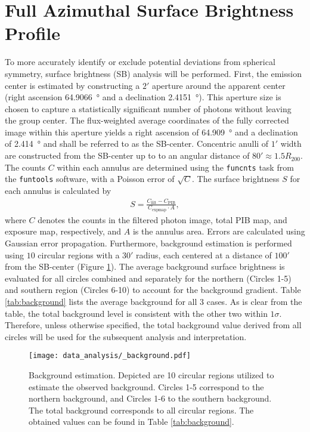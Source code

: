 \section{Full Azimuthal Surface Brightness Profile}\label{sec:full_az}
To more accurately identify or exclude potential deviations from spherical symmetry, surface brightness (SB) analysis will be performed. First, the emission center is estimated by constructing a \(2'\) aperture around the apparent center (right ascension \SI{64.9066}{\degree} and a declination \SI{2.4151}{\degree}). This aperture size is chosen to capture a statistically significant number of photons without leaving the group center. The flux-weighted average coordinates of the fully corrected image within this aperture yields a right ascension of \SI{64.909}{\degree} and a declination of \SI{2.414}{\degree} and shall be referred to as the SB-center. Concentric anulli of \(1'\) width are constructed from the SB-center up to to an angular distance of \(80' \approx 1.5R_{200}\). The counts \(C\) within each annulus are determined using the \texttt{funcnts} task from the \texttt{funtools} software, with a Poisson error of \(\sqrt{C}\). The surface brightness \(S\) for each annulus is calculated by
\begin{align*}
    S = \frac{C_\text{filt} - C_\text{PIB}}{C_\text{expmap}\cdot A},
\end{align*}
where \(C\) denotes the counts in the filtered photon image, total PIB map, and exposure map, respectively, and \(A\) is the annulus area. Errors are calculated using Gaussian error propagation. Furthermore, background estimation is performed using \(10\) circular regions with a \(30'\) radius, each centered at a distance of \(100'\) from the SB-center (Figure \ref{fig:background_circles}). The average background surface brightness is evaluated for all circles combined and separately for the northern (Circles 1-5) and southern region (Circles 6-10) to account for the background gradient. Table \ref{tab:background} lists the average background for all 3 cases. As is clear from the table, the total background level is consistent with the other two within \(1\sigma\). Therefore, unless otherwise specified, the total background value derived from all circles will be used for the subsequent analysis and interpretation.
%
\begin{figure}[htbp]
    \centering
    \texttt{[image: data\_analysis/\_background.pdf]}
    \caption{Background estimation. Depicted are 10 circular regions utilized to estimate the observed background. Circles 1-5 correspond to the northern background, and Circles 1-6 to the southern background. The total background corresponds to all circular regions. The obtained values can be found in Table \ref{tab:background}.}
    \label{fig:background_circles}
\end{figure}
